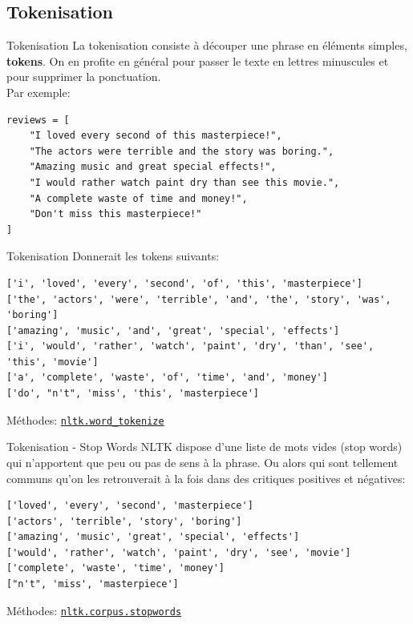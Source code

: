 \documentclass[10pt]{beamer}  %
\begin{document}
\subsection[Tokenisation]{Tokenisation}

\begin{frame}[fragile]{Tokenisation}
	La tokenisation consiste à découper une phrase en éléments simples, \textbf{tokens}. On en profite en général pour passer le texte en lettres minuscules et pour supprimer la ponctuation.\\
	
	Par exemple:
	\begin{lstlisting}
reviews = [
	"I loved every second of this masterpiece!",
	"The actors were terrible and the story was boring.",
	"Amazing music and great special effects!",
	"I would rather watch paint dry than see this movie.",
	"A complete waste of time and money!",
	"Don't miss this masterpiece!"
]
	\end{lstlisting}
\end{frame}

\begin{frame}[fragile]{Tokenisation}
	Donnerait les tokens suivants:
	\begin{lstlisting}
['i', 'loved', 'every', 'second', 'of', 'this', 'masterpiece']
['the', 'actors', 'were', 'terrible', 'and', 'the', 'story', 'was', 'boring']
['amazing', 'music', 'and', 'great', 'special', 'effects']
['i', 'would', 'rather', 'watch', 'paint', 'dry', 'than', 'see', 'this', 'movie']
['a', 'complete', 'waste', 'of', 'time', 'and', 'money']
['do', "n't", 'miss', 'this', 'masterpiece']
	\end{lstlisting}
	\vfill
	Méthodes: \href{https://www.nltk.org/api/nltk.tokenize.html\#nltk-tokenize-package}{\texttt{nltk.word\_tokenize}}
\end{frame}

\begin{frame}[fragile]{Tokenisation - Stop Words}
	NLTK dispose d'une liste de mots vides (stop words) qui n'apportent que peu ou pas de sens à la phrase. Ou alors qui sont tellement communs qu'on les retrouverait à la fois dans des critiques positives et négatives:
	\begin{lstlisting}
['loved', 'every', 'second', 'masterpiece']
['actors', 'terrible', 'story', 'boring']
['amazing', 'music', 'great', 'special', 'effects']
['would', 'rather', 'watch', 'paint', 'dry', 'see', 'movie']
['complete', 'waste', 'time', 'money']
["n't", 'miss', 'masterpiece']
	\end{lstlisting}
	\vfill
	Méthodes: \href{https://www.nltk.org/howto/corpus.html\#word-lists-and-lexicons}{\texttt{nltk.corpus.stopwords}}
\end{frame}
\end{document}
